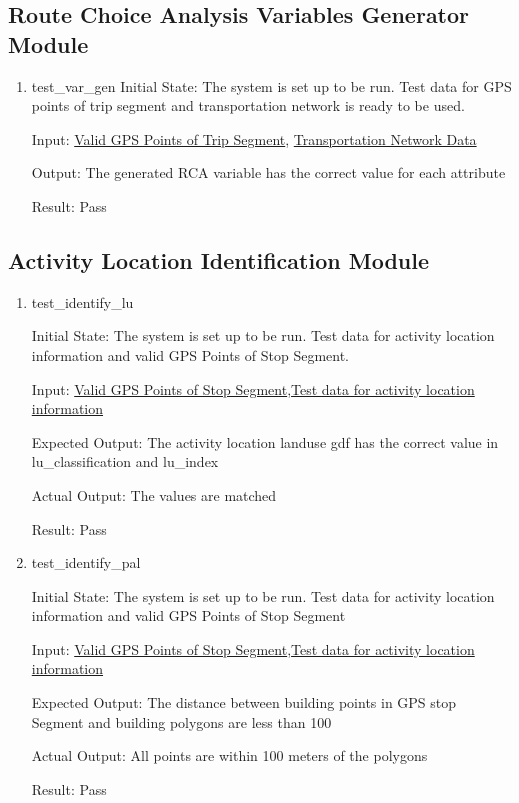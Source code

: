 \documentclass[12pt, titlepage]{article}
\begin{document}
\subsection{Route Choice Analysis Variables Generator Module}
\begin{enumerate}
    \item{test\_var\_gen}\label{test_var_gen}
    Initial State: The system is set up to be run. Test data for GPS points of trip segment and transportation network is ready to be used.

    Input: \href{https://github.com/paezha/PyERT-BLACK/tree/rev0-test/test/test_data/test_rs_trip_seg}{Valid GPS Points of Trip Segment}, \href{https://github.com/paezha/PyERT-BLACK/tree/rev0-test/test/test_data/test_rs_network_g.osm}{Transportation Network Data}

    Output: The generated RCA variable has the correct value for each attribute

    Result: Pass
\end{enumerate}

\subsection{Activity Location Identification Module}
\begin{enumerate}
    \item{test\_identify\_lu} \label{test_identify_lu}
        
    Initial State: The system is set up to be run. Test data for activity location information and valid GPS Points of Stop Segment.
    
    Input: \href{https://github.com/paezha/PyERT-BLACK/tree/rev0-test/test/test_data/test_al_info_stop_seg}{Valid GPS Points of Stop Segment},\href{https://github.com/paezha/PyERT-BLACK/blob/rev0-test/test/test_data/test_al_info_data.gpkg}{Test data for activity location information}
    
    Expected Output: The activity location landuse gdf has the correct value in lu\_classification and 
    lu\_index
    
    Actual Output: The values are matched 

    Result: Pass
    \item{test\_identify\_pal} \label{test_identify_pal}
    
    Initial State: The system is set up to be run. Test data for activity location information and valid GPS Points of Stop Segment
    
    Input: \href{https://github.com/paezha/PyERT-BLACK/tree/rev0-test/test/test_data/test_al_info_stop_seg}{Valid GPS Points of Stop Segment},\href{https://github.com/paezha/PyERT-BLACK/blob/rev0-test/test/test_data/test_al_info_data.gpkg}{Test data for activity location information}
    
    Expected Output: The distance between building points in GPS stop Segment and building polygons are less than 100
    
    Actual Output: All points are within 100 meters of the polygons

    Result: Pass
\end{enumerate}
\end{document}
